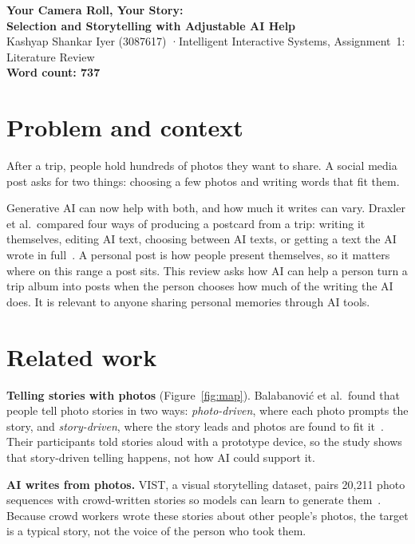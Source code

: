 \documentclass[11pt,a4paper]{article}
\newcommand{\wordcount}{737}
\begin{document}
\begin{center}
  {\sffamily\Large\bfseries Your Camera Roll, Your Story:\\
  Selection and Storytelling with Adjustable AI Help}\\[1ex]
  {\sffamily Kashyap Shankar Iyer (3087617) \quad·\quad Intelligent Interactive Systems,
  Assignment~1: Literature Review}\\[0.4ex]
  {\sffamily\bfseries Word count: \wordcount}
\end{center}

\section{Problem and context}

After a trip, people hold hundreds of photos they want to share. A social media post asks for
two things: choosing a few photos and writing words that fit them.

Generative AI can now help with both, and how much it writes can vary. Draxler
et al.\ compared four ways of producing a postcard from a trip: writing it
themselves, editing AI text, choosing between AI texts, or getting a text the AI wrote
in full~\cite{draxler_ai_2024}. A personal post is how people present themselves, so it matters where on this
range a post sits. This review asks how AI can help a person turn a trip album
into posts when the person chooses how much of the writing the AI does. It
is relevant to anyone sharing personal memories through AI tools.

\section{Related work}

\textbf{Telling stories with photos} (Figure~\ref{fig:map}). Balabanović et al.\
found that people tell photo stories in two ways: \emph{photo-driven}, where each
photo prompts the story, and \emph{story-driven}, where the story leads and
photos are found to fit it~\cite{balabanovic_storytelling_2000}. Their
participants told stories aloud with a prototype device, so the study shows that
story-driven telling happens, not how AI could support it.

\textbf{AI writes from photos.} VIST, a visual storytelling dataset, pairs
20,211 photo sequences with crowd-written stories so models can learn to generate
them~\cite{huang_visual_2016}. Because crowd
workers wrote these stories about other people's photos, the target is a typical
story, not the voice of the person who took them.
\end{document}
